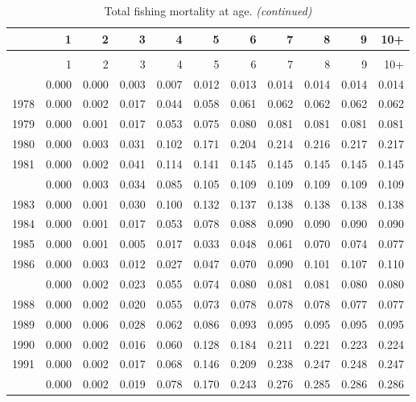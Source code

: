 \documentclass[
]{article}
\begin{document}
\begin{longtable}[t]{lrrrrrrrrrr}
\caption{\label{tab:FAA-tot-table}Total fishing mortality at age.}\\
\toprule
  & 1 & 2 & 3 & 4 & 5 & 6 & 7 & 8 & 9 & 10+\\
\midrule
\endfirsthead
\caption[]{Total fishing mortality at age. \textit{(continued)}}\\
\toprule
  & 1 & 2 & 3 & 4 & 5 & 6 & 7 & 8 & 9 & 10+\\
\midrule
\endhead

\endfoot
\bottomrule
\endlastfoot
1977 & 0.000 & 0.000 & 0.003 & 0.007 & 0.012 & 0.013 & 0.014 & 0.014 & 0.014 & 0.014\\
1978 & 0.000 & 0.002 & 0.017 & 0.044 & 0.058 & 0.061 & 0.062 & 0.062 & 0.062 & 0.062\\
1979 & 0.000 & 0.001 & 0.017 & 0.053 & 0.075 & 0.080 & 0.081 & 0.081 & 0.081 & 0.081\\
1980 & 0.000 & 0.003 & 0.031 & 0.102 & 0.171 & 0.204 & 0.214 & 0.216 & 0.217 & 0.217\\
1981 & 0.000 & 0.002 & 0.041 & 0.114 & 0.141 & 0.145 & 0.145 & 0.145 & 0.145 & 0.145\\
\addlinespace
1982 & 0.000 & 0.003 & 0.034 & 0.085 & 0.105 & 0.109 & 0.109 & 0.109 & 0.109 & 0.109\\
1983 & 0.000 & 0.001 & 0.030 & 0.100 & 0.132 & 0.137 & 0.138 & 0.138 & 0.138 & 0.138\\
1984 & 0.000 & 0.001 & 0.017 & 0.053 & 0.078 & 0.088 & 0.090 & 0.090 & 0.090 & 0.090\\
1985 & 0.000 & 0.001 & 0.005 & 0.017 & 0.033 & 0.048 & 0.061 & 0.070 & 0.074 & 0.077\\
1986 & 0.000 & 0.003 & 0.012 & 0.027 & 0.047 & 0.070 & 0.090 & 0.101 & 0.107 & 0.110\\
\addlinespace
1987 & 0.000 & 0.002 & 0.023 & 0.055 & 0.074 & 0.080 & 0.081 & 0.081 & 0.080 & 0.080\\
1988 & 0.000 & 0.002 & 0.020 & 0.055 & 0.073 & 0.078 & 0.078 & 0.078 & 0.077 & 0.077\\
1989 & 0.000 & 0.006 & 0.028 & 0.062 & 0.086 & 0.093 & 0.095 & 0.095 & 0.095 & 0.095\\
1990 & 0.000 & 0.002 & 0.016 & 0.060 & 0.128 & 0.184 & 0.211 & 0.221 & 0.223 & 0.224\\
1991 & 0.000 & 0.002 & 0.017 & 0.068 & 0.146 & 0.209 & 0.238 & 0.247 & 0.248 & 0.247\\
\addlinespace
1992 & 0.000 & 0.002 & 0.019 & 0.078 & 0.170 & 0.243 & 0.276 & 0.285 & 0.286 & 0.286\\

\end{longtable}
\end{document}
